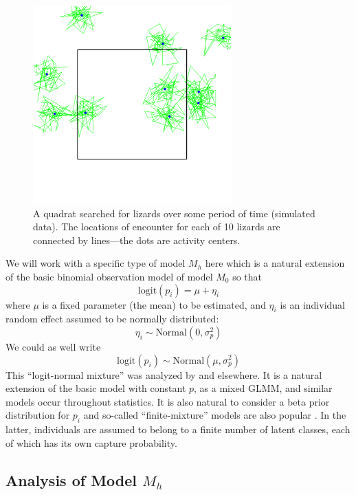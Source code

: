 \begin{figure}
\begin{center}
\includegraphics[height=3in]{Ch3-Closed/figs/quadrat}
\end{center}
\caption{A quadrat searched for lizards over some period of time
  (simulated data). The locations of encounter for each of 10 lizards are
  connected by lines---the dots are activity centers.}
\label{closed.fig.quadrat}
\end{figure}

We will work with a specific type of model $M_{h}$ here which is a
natural extension of
the basic binomial observation model of model $M_{0}$ so
that
\[
\mbox{logit}(p_{i}) = \mu + \eta_{i}
\]
where $\mu$ is a fixed parameter (the mean) to be estimated, and
$\eta_{i}$ is an individual random effect assumed to be normally distributed:
\[
\eta_{i} \sim \mbox{Normal}(0, \sigma_{p}^2)
\]
We could as well write
\[
\mbox{logit}(p_{i}) \sim \mbox{Normal}(\mu,\sigma_{p}^2)
\]
This ``logit-normal mixture'' was analyzed by
\citet{coull_agresti:1999} and elsewhere. It is a natural extension of
the basic model with constant $p$, as a mixed GLMM, and similar models
occur throughout statistics. It is also natural to consider a beta
prior distribution for $p_{i}$ \citep{dorazio_royle:2003} and
so-called ``finite-mixture'' models are also popular
\citep{norris_pollock:1996, pledger:2000}. In the latter, individuals
are assumed to belong to a finite number of latent classes, each of
which has its own capture probability.


\subsection{Analysis of Model $M_h$}

